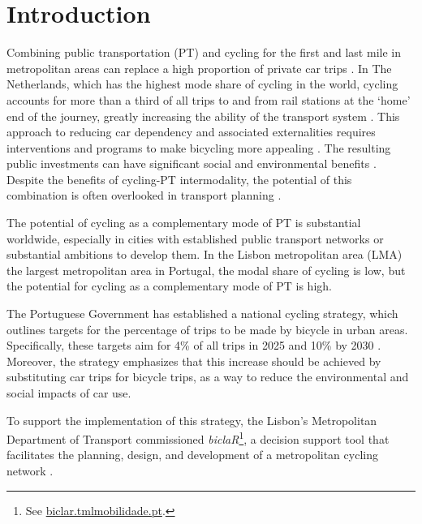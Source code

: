 \documentclass[review, doubleblind, 3p,
authoryear]{elsarticle} %
\begin{document}
\hypersetup{citecolor=black}

\section{Introduction}\label{introduction}

Combining public transportation (PT) and cycling for the first and last
mile in metropolitan areas can replace a high proportion of private car
trips \citep{MARTENS2007326, vanmil_insights_2021}. In The Netherlands,
which has the highest mode share of cycling in the world, cycling
accounts for more than a third of all trips to and from rail stations at
the `home' end of the journey, greatly increasing the ability of the
transport system \citep{RIETVELD200071}. This approach to reducing car
dependency and associated externalities requires interventions and
programs to make bicycling more appealing \citep{lapaix_role_2021}. The
resulting public investments can have significant social and
environmental benefits
\citep{internationaltransportforum_integrating_2017}. Despite the
benefits of cycling-PT intermodality, the potential of this combination
is often overlooked in transport planning \citep{lapaix_role_2021}.

The potential of cycling as a complementary mode of PT is substantial
worldwide, especially in cities with established public transport
networks or substantial ambitions to develop them. In the Lisbon
metropolitan area (LMA) the largest metropolitan area in Portugal, the
modal share of cycling is low, but the potential for cycling as a
complementary mode of PT is high.

The Portuguese Government has established a national cycling strategy,
which outlines targets for the percentage of trips to be made by bicycle
in urban areas. Specifically, these targets aim for 4\% of all trips in
2025 and 10\% by 2030 \citep{ENMAC}. Moreover, the strategy emphasizes
that this increase should be achieved by substituting car trips for
bicycle trips, as a way to reduce the environmental and social impacts
of car use.

To support the implementation of this strategy, the Lisbon's
Metropolitan Department of Transport commissioned
\emph{biclaR}\footnote{See
  \href{https://biclar.tmlmobilidade.pt/}{biclar.tmlmobilidade.pt}.}, a
decision support tool that facilitates the planning, design, and
development of a metropolitan cycling network \citep{felix2023}.
\end{document}
